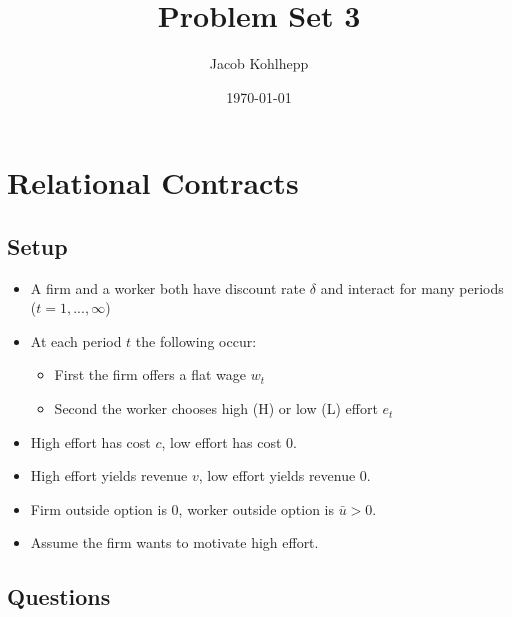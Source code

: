 \documentclass{article}
\title{Problem Set 3}
\author{Jacob Kohlhepp}
\date{\today}
\begin{document}
\maketitle




\section{Relational Contracts}


\subsection{Setup}
\begin{itemize}
    \item A firm and a worker both have discount rate $\delta$ and interact for many periods ($t=1,...,\infty$)
    \item At each period $t$ the following occur:
    \begin{itemize}
        \item First the firm offers a flat wage $w_t$
        \item Second the worker chooses high (H) or low (L) effort $e_t$
    \end{itemize}
    \item High effort has cost $c$, low effort has cost 0.
    \item High effort yields revenue $v$, low effort yields revenue 0.
    \item Firm outside option is 0, worker outside option is $\bar u>0$.
    \item Assume the firm wants to motivate high effort.
\end{itemize}

\subsection{Questions}
\end{document}
